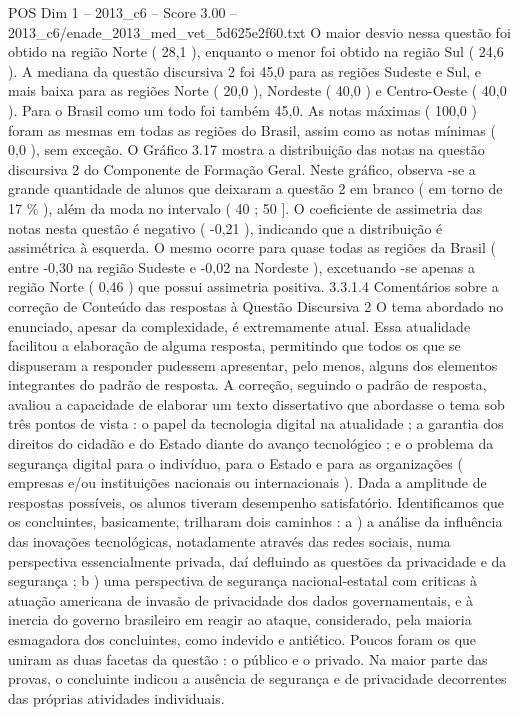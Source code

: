 \begin{textsample}{POS Dim 1 – 2013\_c6 – Score 3.00 – 2013\_c6/enade\_2013\_med\_vet\_5d625e2f60.txt}
O maior desvio nessa questão foi obtido na região Norte ( 28,1 ), enquanto o menor foi obtido na região Sul ( 24,6 ).
A mediana da questão discursiva 2 foi 45,0 para as regiões Sudeste e Sul, e mais baixa para as regiões Norte ( 20,0 ), Nordeste ( 40,0 ) e Centro-Oeste ( 40,0 ).
Para o Brasil como um todo foi também 45,0.
As notas máximas ( 100,0 ) foram as mesmas em todas as regiões do Brasil, assim como as notas mínimas ( 0,0 ), sem exceção.
O Gráfico 3.17 mostra a distribuição das notas na questão discursiva 2 do Componente de Formação Geral.
Neste gráfico, observa -se a grande quantidade de alunos que deixaram a questão 2 em branco ( em torno de 17 \% ), além da moda no intervalo ( 40 ; 50 ].
O coeficiente de assimetria das notas nesta questão é negativo ( -0,21 ), indicando que a distribuição é assimétrica à esquerda.
O mesmo ocorre para quase todas as regiões da Brasil ( entre -0,30 na região Sudeste e -0,02 na Nordeste ), excetuando -se apenas a região Norte ( 0,46 ) que possui assimetria positiva. 3.3.1.4 Comentários sobre a correção de Conteúdo das respostas à Questão Discursiva 2 O tema abordado no enunciado, apesar da complexidade, é extremamente atual.
Essa atualidade facilitou a elaboração de alguma resposta, permitindo que todos os que se dispuseram a responder pudessem apresentar, pelo menos, alguns dos elementos integrantes do padrão de resposta.
A correção, seguindo o padrão de resposta, avaliou a capacidade de elaborar um texto dissertativo que abordasse o tema sob três pontos de vista : o papel da tecnologia digital na atualidade ; a garantia dos direitos do cidadão e do Estado diante do avanço tecnológico ; e o problema da segurança digital para o indivíduo, para o Estado e para as organizações ( empresas e/ou instituições nacionais ou internacionais ).
Dada a amplitude de respostas possíveis, os alunos tiveram desempenho satisfatório.
Identificamos que os concluintes, basicamente, trilharam dois caminhos : a ) a análise da influência das inovações tecnológicas, notadamente através das redes sociais, numa perspectiva essencialmente privada, daí defluindo as questões da privacidade e da segurança ; b ) uma perspectiva de segurança nacional-estatal com criticas à atuação americana de invasão de privacidade dos dados governamentais, e à inercia do governo brasileiro em reagir ao ataque, considerado, pela maioria esmagadora dos concluintes, como indevido e antiético.
Poucos foram os que uniram as duas facetas da questão : o público e o privado.
Na maior parte das provas, o concluinte indicou a ausência de segurança e de privacidade decorrentes das próprias atividades individuais.

\end{textsample}
